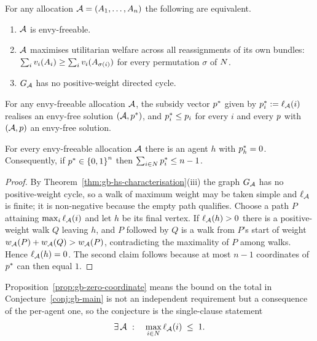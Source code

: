\begin{theorem}[\cite{HS19}]
\label{thm:gb-hs-characterisation}
For any allocation $\mathcal{A} = (A_{1},\dots,A_{n})$ the following are
equivalent.
\begin{enumerate}
  \item[(i)] $\mathcal{A}$ is envy-freeable.
  \item[(ii)] $\mathcal{A}$ maximises utilitarian welfare across all reassignments
    of its own bundles: $\sum_{i} v_i(A_{i}) \ge \sum_{i} v_i(A_{\sigma(i)})$
    for every permutation $\sigma$ of $N$.
  \item[(iii)] $G_{\mathcal{A}}$ has no positive-weight directed cycle.
\end{enumerate}
\end{theorem}

\begin{theorem}[\cite{HS19}]
\label{thm:gb-hs-minsubsidy}
For any envy-freeable allocation $\mathcal{A}$, the subsidy vector $p^{*}$
given by $p^{*}_i := \ell_{\mathcal{A}}(i)$ realises an envy-free solution
$(\mathcal{A},p^{*})$, and $p^{*}_i \le p_i$ for every $i$ and
every $p$ with $(\mathcal{A},p)$ an envy-free solution.
\end{theorem}

\begin{proposition}
\label{prop:gb-zero-coordinate}
For every envy-freeable allocation $\mathcal{A}$ there is an agent $h$ with
$p^{*}_h = 0$. Consequently, if $p^{*} \in \left\{0,1\right\}^n$ then
$\sum_{i \in N} p^{*}_i \le n-1$.
\end{proposition}

\begin{proof}
By Theorem~\ref{thm:gb-hs-characterisation}(iii) the graph
$G_{\mathcal{A}}$ has no positive-weight cycle, so a walk of maximum weight
may be taken simple and $\ell_{\mathcal{A}}$ is finite; it is non-negative because
the empty path qualifies. Choose a path $P$ attaining
$\max_{i} \ell_{\mathcal{A}}(i)$ and let $h$ be its final vertex. If
$\ell_{\mathcal{A}}(h) > 0$ there is a positive-weight walk $Q$ leaving $h$, and
$P$ followed by $Q$ is a walk from $P$'s start of weight
$w_{\mathcal{A}}(P) + w_{\mathcal{A}}(Q) > w_{\mathcal{A}}(P)$, contradicting the
maximality of $P$ among walks. Hence $\ell_{\mathcal{A}}(h) = 0$. The second claim
follows because at most $n-1$ coordinates of $p^{*}$ can then equal $1$.
\end{proof}

Proposition~\ref{prop:gb-zero-coordinate} means the bound on the total in
Conjecture~\ref{conj:gb-main} is not an independent requirement but a
consequence of the per-agent one, so the conjecture is the single-clause
statement
\[
  \exists\, \mathcal{A} \ :\quad \max_{i \in N} \ell_{\mathcal{A}}(i) \;\le\; 1 .
\]

